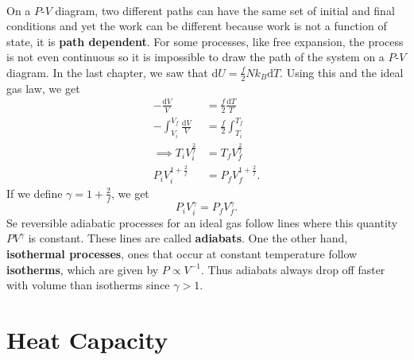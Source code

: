 \documentclass[../thermodynamics.tex]{subfiles}
\begin{document}
        \paragraph{}
        On a $P$-$V$ diagram, two different paths can have the same set of initial and final conditions and yet the work can be different because work is not a function of state, it is \textbf{path dependent}.
        For some processes, like free expansion, the process is not even continuous so it is impossible to draw the path of the system on a $P$-$V$ diagram.
        In the last chapter, we saw that $\mathrm{d}U=\frac{f}{2}Nk_B\mathrm{d}T$.
        Using this and the ideal gas law, we get
        \begin{align}
            -\frac{\mathrm{d}V}{V}&=\frac{f}{2}\frac{\mathrm{d}T}{T}\\
            -\int_{V_i}^{V_f}\frac{\mathrm{d}V}{V}&=\frac{f}{2}\int_{T_i}^{T_f}\\
            \implies T_iV_i^{\frac{2}{f}}&=T_fV_f^{\frac{2}{f}}\\
            P_iV_i^{1+\frac{2}{f}}&=P_fV_f^{1+\frac{2}{f}}.
        \end{align}
        If we define $\gamma=1+\frac{2}{f}$, we get
        \begin{equation}
            P_iV_i^\gamma=P_fV_f^\gamma.
        \end{equation}
        Se reversible adiabatic processes for an ideal gas follow lines where this quantity $PV^\gamma$ is constant.
        These lines are called \textbf{adiabats}.
        One the other hand, \textbf{isothermal processes}, ones that occur at constant temperature follow \textbf{isotherms}, which are given by $P\propto V^{-1}$.
        Thus adiabats always drop off faster with volume than isotherms since $\gamma>1$.

    \section{Heat Capacity}
\end{document}
